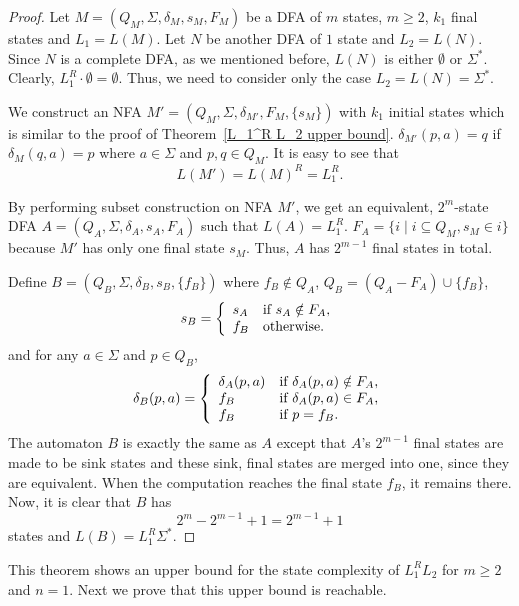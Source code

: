 \documentclass[10pt]{article}
\begin{document}
\begin{proof}
Let $M=(Q_M,\Sigma , \delta_M , s_M, F_M)$ be a DFA of $m$ states,
$m\ge 2$, $k_1$ final states and $L_1=L(M)$. Let $N$ be another DFA
of $1$ state and $L_2=L(N)$. Since $N$ is a complete DFA, as we
mentioned before, $L(N)$ is either $\emptyset$ or $\Sigma^*$.
Clearly, $L_1^R\cdot \emptyset=\emptyset$. Thus, we need to consider
only the case $L_2=L(N)=\Sigma^*$.

We construct an NFA $M'=(Q_M,\Sigma , \delta_{M'} , F_M, \{s_M\})$
with $k_1$ initial states which is similar to the proof of
Theorem~\ref{L_1^R L_2 upper bound}. $\delta_{M'}(p,a)=q$ if
$\delta_M(q,a)=p$ where $a\in \Sigma$ and $p,q\in Q_M$. It is easy
to see that
$$L(M')=L(M)^R=L_1^R.$$

By performing subset construction on NFA $M'$, we get an equivalent,
$2^m$-state DFA $A=(Q_A,\Sigma , \delta_A , s_A, F_A)$ such that
$L(A)=L_1^R$. $F_A=\{i\mid i\subseteq Q_M, s_M\in i\}$ because $M'$
has only one final state $s_M$. Thus, $A$ has $2^{m-1}$ final states in total.

Define $B=(Q_B,\Sigma , \delta_B , s_B, \{f_B\})$ where $f_B\notin
Q_A$, $Q_B=(Q_A-F_A)\cup \{f_B\}$,
\begin{eqnarray*}
s_B = \left\{
\begin{array}{l l}
  s_A & \mbox{if }s_A\notin F_A,\\
  f_B & \mbox{otherwise.}\\
\end{array} \right.
\end{eqnarray*}
and for any $a\in \Sigma$ and $p\in Q_B$,
\begin{eqnarray*}
\delta_B(p, a) = \left\{
\begin{array}{l l}
  \delta_A(p, a) & \mbox{if }\delta_A(p, a)\notin F_A,\\
  f_B & \mbox{if }\delta_A(p, a)\in F_A,\\
  f_B & \mbox{if }p=f_B.\\
\end{array} \right.
\end{eqnarray*}
The automaton $B$ is exactly the same as $A$ except that $A$'s
$2^{m-1}$ final states are made to be sink states and these sink,
final states are merged into one, since they are equivalent. When
the computation reaches the final state $f_B$, it remains there.
Now, it is clear that $B$ has
$$2^m-2^{m-1}+1=2^{m-1}+1$$ states and $L(B)=L_1^R \Sigma^*$.
\end{proof}
This theorem shows an upper bound for the state complexity of $L_1^R
L_2$ for $m \ge 2$ and $n = 1$. Next we prove that this upper bound
is reachable.
\end{document}
